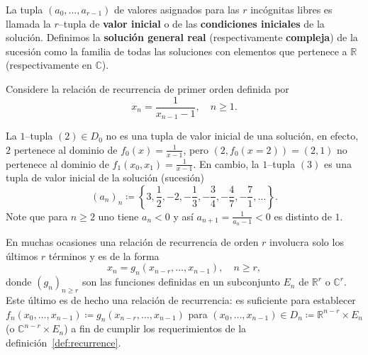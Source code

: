 La tupla $\left(a_{0},\ldots,a_{r-1}\right)$ de valores asignados para las $r$ incógnitas libres es llamada la $r$--tupla de \textbf{valor inicial} o de las \textbf{condiciones iniciales} de la solución. Definimos la \textbf{solución general real} (respectivamente \textbf{compleja}) de la sucesión como la familia de todas las soluciones con elementos que pertenece a $\mathds{R}$ (respectivamente en $\mathds{C}$).

\begin{example}
	Considere la relación de recurrencia de primer orden definida por \[x_{n}=\frac{1}{x_{n-1}-1},\quad n\geq1.\]

	La $1$--tupla $\left(2\right)\in D_{0}$ no es una tupla de valor inicial de una solución, en efecto, $2$ pertenece al dominio de $f_{0}\left(x\right)=\frac{1}{x-1}$, pero $\left(2,f_{0}(x=2)\right)=\left(2,1\right)$ no pertenece al dominio de $f_{1}\left(x_{0},x_{1}\right)=\frac{1}{x-1}$. En cambio, la $1$--tupla $\left(3\right)$ es una tupla de valor inicial de la solución (sucesión) \[ {\left(a_{n}\right)}_{n}\coloneqq\left\{3,\frac{1}{2},-2,-\frac{1}{3},-\frac{3}{4},-\frac{4}{7},-\frac{7}{1},\ldots\right\}. \] Note que para $n\geq2$ uno tiene $a_{n}<0$ y así $a_{n+1}=\frac{1}{a_{n}-1}<0$ es distinto de $1$.
\end{example}

\begin{example}
	En muchas ocasiones una relación de recurrencia de orden $r$ involucra solo los últimos $r$ términos y es de la forma	\[ x_{n}=g_{n}\left(x_{n-r},\ldots,x_{n-1}\right),\quad n\geq r, \] donde ${\left(g_{n}\right)}_{n\geq r}$ son las funciones definidas en un subconjunto $E_{n}$ de $\mathds{R}^{r}$ o $\mathds{C}^{r}$. Este último es de hecho una relación de recurrencia: es suficiente para establecer $f_{n}\left(x_{0},\ldots,x_{n-1}\right)\coloneqq g_{n}\left(x_{n-r},\ldots,x_{n-1}\right)$ para $\left(x_{0},\ldots,x_{n-1}\right)\in D_{n}\coloneqq\mathds{R}^{n-r}\times E_{n}$ (o $\mathds{C}^{n-r}\times E_{n}$) a fin de cumplir los requerimientos de la definición~\eqref{def:recurrence}.
\end{example}

